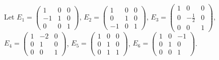 \begin{enumerate}
Let $E_1=\begin{pmatrix}1&0&0\\-1&1&0\\0&0&1\end{pmatrix}$, $E_2=\begin{pmatrix}1&0&0\\0&1&0\\-1&0&1\end{pmatrix}$, $E_3=\begin{pmatrix}1&0&0\\0&-\frac{1}{2}&0\\0&0&1\end{pmatrix}$, $E_4=\begin{pmatrix}1&-2&0\\0&1&0\\0&0&1\end{pmatrix}$, $E_5=\begin{pmatrix}1&0&0\\0&1&0\\0&1&1\end{pmatrix}$, $E_6=\begin{pmatrix}1&0&-1\\0&1&0\\0&0&1\end{pmatrix}$.


\end{enumerate}
